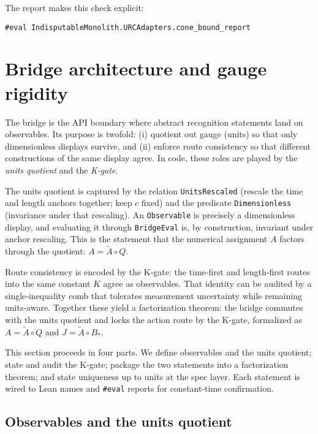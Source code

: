 \documentclass[11pt,a4paper,twoside]{article}
\numberwithin{equation}{section}
\newcommand{\Atilde}{\tilde{A}}
\newcommand{\Bstar}{B_*}
\theoremstyle{customthm}
\theoremstyle{customdef}
\theoremstyle{customrem}
\begin{document}
The report makes this check explicit:

\begin{lstlisting}
#eval IndisputableMonolith.URCAdapters.cone_bound_report
\end{lstlisting}

\section{Bridge architecture and gauge rigidity}\label{sec:bridge}

The bridge is the API boundary where abstract recognition statements land on observables. Its purpose is twofold: (i) quotient out gauge (units) so that only dimensionless displays survive, and (ii) enforce route consistency so that different constructions of the same display agree. In code, these roles are played by the \emph{units quotient} and the \emph{K‐gate}.

The units quotient is captured by the relation \texttt{UnitsRescaled} (rescale the time and length anchors together; keep \(c\) fixed) and the predicate \texttt{Dimensionless} (invariance under that rescaling). An \texttt{Observable} is precisely a dimensionless display, and evaluating it through \texttt{BridgeEval} is, by construction, invariant under anchor rescaling. This is the statement that the numerical assignment \(A\) factors through the quotient: \(A = \Atilde \circ Q\).

Route consistency is encoded by the K‐gate: the time‐first and length‐first routes into the same constant \(K\) agree as observables. That identity can be audited by a single‐inequality comb that tolerates measurement uncertainty while remaining units‐aware. Together these yield a factorization theorem: the bridge commutes with the units quotient and locks the action route by the K‐gate, formalized as \(A = \Atilde \circ Q\) and \(J = \Atilde \circ \Bstar\).

This section proceeds in four parts. We define observables and the units quotient; state and audit the K‐gate; package the two statements into a factorization theorem; and state uniqueness up to units at the spec layer. Each statement is wired to Lean names and \texttt{\#eval} reports for constant‐time confirmation.

\subsection{Observables and the units quotient}
\end{document}

